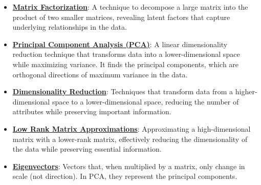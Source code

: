 \documentclass{article}%
\begin{document}
\begin{itemize}[leftmargin=*]%
\item \href{https://purdue.brightspace.com/d2l/common/assets/pdfjs-d2l-dist/1.0.14-legacy/web/viewer.html?file=\%2Fcontent\%2Fenforced\%2F1095467-wl.202510.CS.24300.001\%2F11L2-svd-pca-recommender.pdf\%3Fou\%3D1095467\&lang=en-us\&container=d2l-fileviewer-rendered-pdf\&fullscreen=d2l-fileviewer-rendered-pdf-dialog\&height=667#page=2}{\textbf{Matrix Factorization}}: A technique to decompose a large matrix into the product of two smaller matrices, revealing latent factors that capture underlying relationships in the data.%
\item \href{https://purdue.brightspace.com/d2l/common/assets/pdfjs-d2l-dist/1.0.14-legacy/web/viewer.html?file=\%2Fcontent\%2Fenforced\%2F1095467-wl.202510.CS.24300.001\%2F11L2-svd-pca-recommender.pdf\%3Fou\%3D1095467\&lang=en-us\&container=d2l-fileviewer-rendered-pdf\&fullscreen=d2l-fileviewer-rendered-pdf-dialog\&height=667#page=15}{\textbf{Principal Component Analysis (PCA)}}: A linear dimensionality reduction technique that transforms data into a lower-dimensional space while maximizing variance. It finds the principal components, which are orthogonal directions of maximum variance in the data.%
\item \href{https://purdue.brightspace.com/d2l/common/assets/pdfjs-d2l-dist/1.0.14-legacy/web/viewer.html?file=\%2Fcontent\%2Fenforced\%2F1095467-wl.202510.CS.24300.001\%2F11L2-svd-pca-recommender.pdf\%3Fou\%3D1095467\&lang=en-us\&container=d2l-fileviewer-rendered-pdf\&fullscreen=d2l-fileviewer-rendered-pdf-dialog\&height=667#page=8}{\textbf{Dimensionality Reduction}}: Techniques that transform data from a higher-dimensional space to a lower-dimensional space, reducing the number of attributes while preserving important information.%
\item \href{https://purdue.brightspace.com/d2l/common/assets/pdfjs-d2l-dist/1.0.14-legacy/web/viewer.html?file=\%2Fcontent\%2Fenforced\%2F1095467-wl.202510.CS.24300.001\%2F11L2-svd-pca-recommender.pdf\%3Fou\%3D1095467\&lang=en-us\&container=d2l-fileviewer-rendered-pdf\&fullscreen=d2l-fileviewer-rendered-pdf-dialog\&height=667#page=9}{\textbf{Low Rank Matrix Approximations}}: Approximating a high-dimensional matrix with a lower-rank matrix, effectively reducing the dimensionality of the data while preserving essential information.%
\item \href{https://purdue.brightspace.com/d2l/common/assets/pdfjs-d2l-dist/1.0.14-legacy/web/viewer.html?file=\%2Fcontent\%2Fenforced\%2F1095467-wl.202510.CS.24300.001\%2F11L2-svd-pca-recommender.pdf\%3Fou\%3D1095467\&lang=en-us\&container=d2l-fileviewer-rendered-pdf\&fullscreen=d2l-fileviewer-rendered-pdf-dialog\&height=667#page=17}{\textbf{Eigenvectors}}: Vectors that, when multiplied by a matrix, only change in scale (not direction). In PCA, they represent the principal components.%

\end{itemize}
\end{document}
